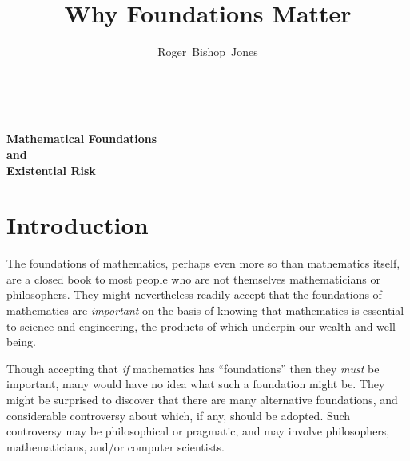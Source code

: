 \documentclass[12pt,titlepage]{article}
\title{Why Foundations Matter}
\author{Roger~Bishop~Jones}
\date{\ }
\begin{document}
                               
\begin{titlepage}
\maketitle






\end{titlepage}

\setcounter{tocdepth}{2}
{\parskip-0pt\tableofcontents}



\pagebreak

\begin{centering}
{\LARGE \bf Mathematical Foundations\\
and\\
Existential Risk\\
}
\end{centering}

\section{Introduction}

The foundations of mathematics, perhaps even more so than mathematics itself, are a closed book to most people who are not themselves mathematicians or philosophers.
They might nevertheless readily accept that the foundations of mathematics are \emph{important} on the basis of knowing that mathematics is essential to science and engineering, the products of which underpin our wealth and well-being.

Though accepting that \emph{if} mathematics has ``foundations'' then they \emph{must} be important, many would have no idea what such a foundation might be.
They might be surprised to discover that there are many alternative foundations, and considerable controversy about which, if any, should be adopted.
Such controversy may be philosophical or pragmatic, and may involve philosophers, mathematicians, and/or computer scientists.
\end{document}
